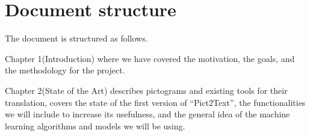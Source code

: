 \section{Document structure}

The document is structured as follows. 

Chapter 1(Introduction) where we have covered the motivation, the goals, and the methodology for the project.

Chapter 2(State of the Art) describes pictograms and existing tools for their translation, covers the state of the first version of ``Pict2Text'', the functionalities we will include to increase its usefulness, and the general idea of the machine learning algorithms and models we will be using. 






